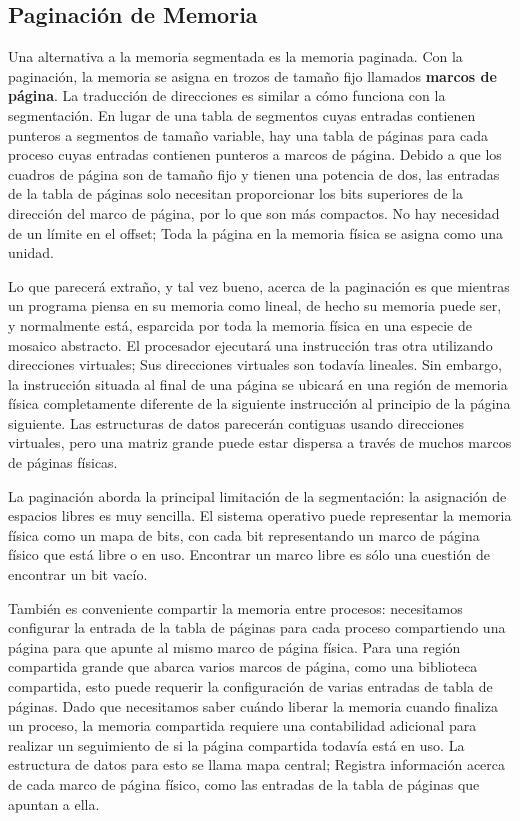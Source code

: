 \documentclass[10pt]{book}
\begin{document}
\subsection{Paginación de Memoria}
Una alternativa a la memoria segmentada es la memoria paginada. Con la paginación, la memoria se asigna en trozos de tamaño fijo llamados \textbf{marcos de página}. La traducción de direcciones es similar a cómo funciona con la segmentación. En lugar de una tabla de segmentos cuyas entradas contienen punteros a segmentos de tamaño variable, hay una tabla de páginas para cada proceso cuyas entradas contienen punteros a marcos de página. Debido a que los cuadros de página son de tamaño fijo y tienen una potencia de dos, las entradas de la tabla de páginas solo necesitan proporcionar los bits superiores de la dirección del marco de página, por lo que son más compactos. No hay necesidad de un límite en el offset; Toda la página en la memoria física se asigna como una unidad. 

Lo que parecerá extraño, y tal vez bueno, acerca de la paginación es que mientras un programa piensa en su memoria como lineal, de hecho su memoria puede ser, y normalmente está, esparcida por toda la memoria física en una especie de mosaico abstracto. El procesador ejecutará una instrucción tras otra utilizando direcciones virtuales; Sus direcciones virtuales son todavía lineales. Sin embargo, la instrucción situada al final de una página se ubicará en una región de memoria física completamente diferente de la siguiente instrucción al principio de la página siguiente. Las estructuras de datos parecerán contiguas usando direcciones virtuales, pero una matriz grande puede estar dispersa a través de muchos marcos de páginas físicas.

La paginación aborda la principal limitación de la segmentación: la asignación de espacios libres es muy sencilla. El sistema operativo puede representar la memoria física como un mapa de bits, con cada bit representando un marco de página físico que está libre o en uso. Encontrar un marco libre es sólo una cuestión de encontrar un bit vacío.

También es conveniente compartir la memoria entre procesos: necesitamos configurar la entrada de la tabla de páginas para cada proceso compartiendo una página para que apunte al mismo marco de página física. Para una región compartida grande que abarca varios marcos de página, como una biblioteca compartida, esto puede requerir la configuración de varias entradas de tabla de páginas. Dado que necesitamos saber cuándo liberar la memoria cuando finaliza un proceso, la memoria compartida requiere una contabilidad adicional para realizar un seguimiento de si la página compartida todavía está en uso. La estructura de datos para esto se llama mapa central; Registra información acerca de cada marco de página físico, como las entradas de la tabla de páginas que apuntan a ella.
\end{document}

